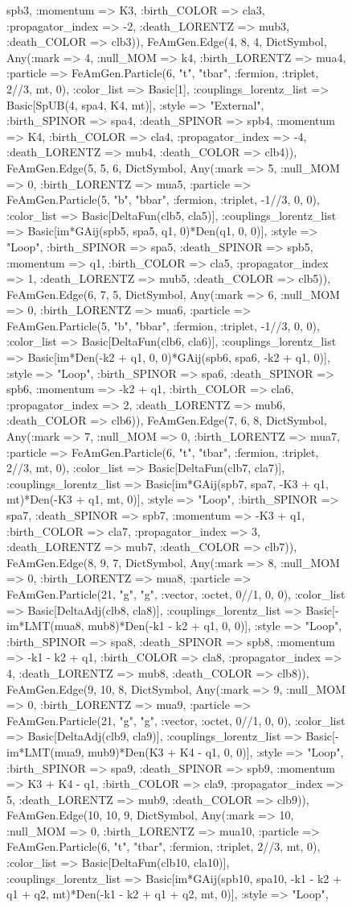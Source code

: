 \documentclass{revtex4}
\begin{document}
\begin{figure}[!htb]
\begin{center}
{spb3, :momentum => K3, :birth_COLOR => cla3, :propagator_index => -2, :death_LORENTZ => mub3, :death_COLOR => clb3)), FeAmGen.Edge(4, 8, 4, Dict{Symbol, Any}(:mark => 4, :null_MOM => k4, :birth_LORENTZ => mua4, :particle => FeAmGen.Particle(6, "t", "tbar", :fermion, :triplet, 2//3, mt, 0), :color_list => Basic[1], :couplings_lorentz_list => Basic[SpUB(4, spa4, K4, mt)], :style => "External", :birth_SPINOR => spa4, :death_SPINOR => spb4, :momentum => K4, :birth_COLOR => cla4, :propagator_index => -4, :death_LORENTZ => mub4, :death_COLOR => clb4)), FeAmGen.Edge(5, 5, 6, Dict{Symbol, Any}(:mark => 5, :null_MOM => 0, :birth_LORENTZ => mua5, :particle => FeAmGen.Particle(5, "b", "bbar", :fermion, :triplet, -1//3, 0, 0), :color_list => Basic[DeltaFun(clb5, cla5)], :couplings_lorentz_list => Basic[im*GAij(spb5, spa5, q1, 0)*Den(q1, 0, 0)], :style => "Loop", :birth_SPINOR => spa5, :death_SPINOR => spb5, :momentum => q1, :birth_COLOR => cla5, :propagator_index => 1, :death_LORENTZ => mub5, :death_COLOR => clb5)), FeAmGen.Edge(6, 7, 5, Dict{Symbol, Any}(:mark => 6, :null_MOM => 0, :birth_LORENTZ => mua6, :particle => FeAmGen.Particle(5, "b", "bbar", :fermion, :triplet, -1//3, 0, 0), :color_list => Basic[DeltaFun(clb6, cla6)], :couplings_lorentz_list => Basic[im*Den(-k2 + q1, 0, 0)*GAij(spb6, spa6, -k2 + q1, 0)], :style => "Loop", :birth_SPINOR => spa6, :death_SPINOR => spb6, :momentum => -k2 + q1, :birth_COLOR => cla6, :propagator_index => 2, :death_LORENTZ => mub6, :death_COLOR => clb6)), FeAmGen.Edge(7, 6, 8, Dict{Symbol, Any}(:mark => 7, :null_MOM => 0, :birth_LORENTZ => mua7, :particle => FeAmGen.Particle(6, "t", "tbar", :fermion, :triplet, 2//3, mt, 0), :color_list => Basic[DeltaFun(clb7, cla7)], :couplings_lorentz_list => Basic[im*GAij(spb7, spa7, -K3 + q1, mt)*Den(-K3 + q1, mt, 0)], :style => "Loop", :birth_SPINOR => spa7, :death_SPINOR => spb7, :momentum => -K3 + q1, :birth_COLOR => cla7, :propagator_index => 3, :death_LORENTZ => mub7, :death_COLOR => clb7)), FeAmGen.Edge(8, 9, 7, Dict{Symbol, Any}(:mark => 8, :null_MOM => 0, :birth_LORENTZ => mua8, :particle => FeAmGen.Particle(21, "g", "g", :vector, :octet, 0//1, 0, 0), :color_list => Basic[DeltaAdj(clb8, cla8)], :couplings_lorentz_list => Basic[-im*LMT(mua8, mub8)*Den(-k1 - k2 + q1, 0, 0)], :style => "Loop", :birth_SPINOR => spa8, :death_SPINOR => spb8, :momentum => -k1 - k2 + q1, :birth_COLOR => cla8, :propagator_index => 4, :death_LORENTZ => mub8, :death_COLOR => clb8)), FeAmGen.Edge(9, 10, 8, Dict{Symbol, Any}(:mark => 9, :null_MOM => 0, :birth_LORENTZ => mua9, :particle => FeAmGen.Particle(21, "g", "g", :vector, :octet, 0//1, 0, 0), :color_list => Basic[DeltaAdj(clb9, cla9)], :couplings_lorentz_list => Basic[-im*LMT(mua9, mub9)*Den(K3 + K4 - q1, 0, 0)], :style => "Loop", :birth_SPINOR => spa9, :death_SPINOR => spb9, :momentum => K3 + K4 - q1, :birth_COLOR => cla9, :propagator_index => 5, :death_LORENTZ => mub9, :death_COLOR => clb9)), FeAmGen.Edge(10, 10, 9, Dict{Symbol, Any}(:mark => 10, :null_MOM => 0, :birth_LORENTZ => mua10, :particle => FeAmGen.Particle(6, "t", "tbar", :fermion, :triplet, 2//3, mt, 0), :color_list => Basic[DeltaFun(clb10, cla10)], :couplings_lorentz_list => Basic[im*GAij(spb10, spa10, -k1 - k2 + q1 + q2, mt)*Den(-k1 - k2 + q1 + q2, mt, 0)], :style => "Loop", }
\end{center}
\end{figure}
\end{document}
